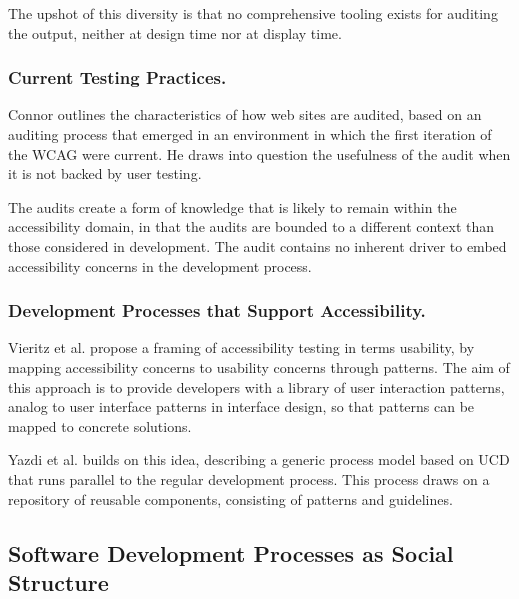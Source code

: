 	The upshot of this diversity is that no comprehensive tooling exists for auditing the output, neither at design time nor at display time.


\subsubsection{Current Testing Practices.} %
	\label{ssub:current_testing_practices_}
	
	Connor \cite{Connor:2010} outlines the characteristics of how web sites are audited, based on an auditing process that emerged in an environment in which the first iteration of the \ac{WCAG} were current. He draws into question the usefulness of the audit when it is not backed by user testing. 

	The audits create a form of knowledge that is likely to remain within the accessibility domain, in that the audits are bounded to a different context than those considered in development. The audit contains no inherent driver to embed accessibility concerns in the development process.  

\subsubsection{Development Processes that Support Accessibility.} %
	\label{ssub:proposed_solutions_}
	Vieritz et al. \cite{Vieritz:2010} propose a framing of accessibility testing in terms usability, by mapping accessibility concerns to usability concerns through patterns. The aim of this approach is to provide developers with a library of user interaction patterns, analog to user interface patterns in interface design, so that patterns can be mapped to concrete solutions.

	Yazdi et al. \cite{Yazdi:2011} builds on this idea, describing a generic process model based on \ac{UCD} that runs parallel to the regular development process. This process draws on a repository of reusable components, consisting of patterns and guidelines.



\subsection{Software Development Processes as Social Structure} %
\label{sub:software_development_processes_as_social_structure}

